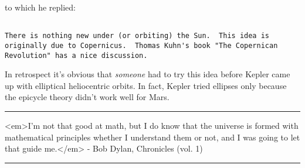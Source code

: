 to which he replied:


\begin{verbatim}

There is nothing new under (or orbiting) the Sun.  This idea is
originally due to Copernicus.  Thomas Kuhn's book "The Copernican
Revolution" has a nice discussion.
\end{verbatim}
    

In retrospect it's obvious that \emph{someone} had to try this idea
before Kepler came up with elliptical heliocentric orbits. In fact,
Kepler tried ellipses only because the epicycle theory didn't work well 
for Mars.

\par\noindent\rule{\textwidth}{0.4pt}
<em>I'm not that good at math, but I do know that the universe
is formed with mathematical principles whether I understand them
or not, and I was going to let that guide me.</em> - Bob Dylan,
Chronicles (vol. 1)

\par\noindent\rule{\textwidth}{0.4pt}

